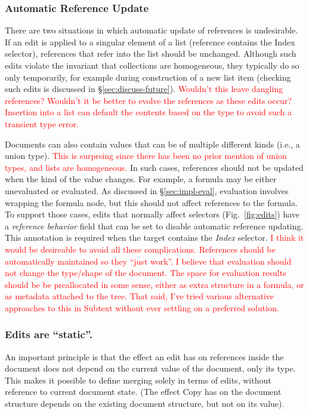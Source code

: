 \documentclass[sigconf,anonymous,screen]{acmart}
\newcommand{\ident}[1]{{\sffamily #1}}
\newcommand{\note}[1]{\textcolor{red}{#1}}
\begin{document}

\subsubsection*{Automatic Reference Update}
There are two situations in which automatic update of references is undesirable. If an edit is
applied to a singular element of a list (reference contains the \ident{Index} selector),
references that refer into the list should be unchanged. Although such edits violate the invariant
that collections are homogeneous, they typically do so only temporarily, for example during
construction of a new list item (checking such edits is discussed in \S\ref{sec:discuss-future}). \note{Wouldn't this leave dangling references? Wouldn't it be better to evolve the references as these edits occur?} \note{Insertion into a list can default the contents based on the type to avoid such a transient type error.}

Documents can also contain values that can be of multiple different kinds (i.e., a union type).
\note{This is surprsing since there has been no prior mention of union types, and lists are homogeneous.}
In such cases, references should not be updated when the kind of the value changes. For example,
a formula may be either unevaluated or evaluated. As discussed in \S\ref{sec:impl-eval}, evaluation
involves wrapping the formula node, but this should not affect references to the formula.
To support those cases, edits that normally affect selectors (Fig.~\ref{fig:edits})
have a \emph{reference behavior} field that can be set to disable automatic reference
updating. This annotation is required when the target contains the \emph{Index} selector.
\note{I think it would be desireable to avoid all these complications. References should be automatically maintained so they ``just work''.}
\note{I believe that evaluation should not change the type/shape of the document. The space for evaluation results should be be preallocated in some sense, either as extra structure in a formula, or as metadata attached to the tree. That said, I've tried various alternative approaches to this in Subtext without ever settling on a preferred solution.}

\subsubsection*{Edits are ``static''.}
An important principle is that the effect an edit has on references inside
the document does not depend on the current value of the document, only its type. This makes it possible to
define merging solely in terms of edits, without reference to current document state.
(The effect \ident{Copy} has on the document structure depends on the existing document
structure, but not on its value).
\end{document}
